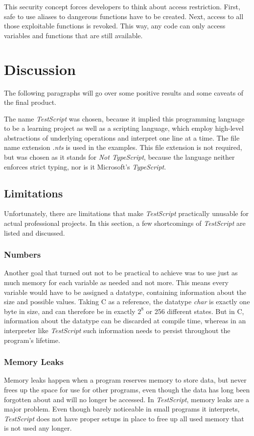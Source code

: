 \documentclass[12pt,a4paper]{article}
\newcommand{\name}{\emph{TestScript}}
\begin{document}
This security concept forces developers to think about access restriction. First, safe to use aliases
to dangerous functions have to be created. Next, access to all those exploitable functions is
revoked. This way, any code can only access variables and functions that are still available.

\section{Discussion}
The following paragraphs will go over some positive results and some caveats of the
final product.

The name \name{} was chosen, because it implied this programming language
to be a learning project as well as a scripting language, which employ
high-level abstractions of underlying operations and interpret one line
at a time. The file name extension \emph{.nts} is used in the examples. This
file extension is not required, but was chosen as it stands for \emph{Not TypeScript}, because
the language neither enforces strict typing, nor is it Microsoft's \emph{TypeScript}.

\subsection{Limitations}\label{Limitations}
Unfortunately, there are limitations that make \name{} practically unusable for actual
professional projects. In this section, a few shortcomings of \name{} are listed
and discussed.

\subsubsection{Numbers}
Another goal that turned out not to be practical to achieve was to use just as much
memory for each variable as needed and not more. This means every variable would
have to be assigned a datatype, containing information about the size and possible values.
Taking C as a reference, the datatype \emph{char} is exactly one byte in size, and
can therefore be in exactly $2^8$ or 256 different states. But in C, information about
the datatype can be discarded at compile time, whereas in an interpreter like \name{} such
information needs to persist throughout the program's lifetime.

\subsubsection{Memory Leaks}\label{memleaks}
Memory leaks happen when a program reserves memory to store data, but
never frees up the space for use for other programs, even though the data
has long been forgotten about and will no longer be accessed.
In \name{}, memory leaks are a major problem. Even though barely noticeable in small
programs it interprets, \name{} does not have proper setups in place to free up
all used memory that is not used any longer.
\end{document}

